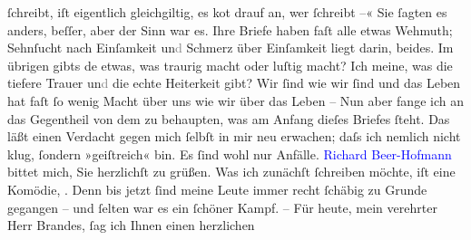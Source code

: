                ſchreibt, iſt eigentlich gleichgiltig, es ko{\geminationm}t drauf an,
               wer ſchreibt –« Sie ſagten es anders, beſſer, aber der Sinn {\pb}war es.\pend
           \pstart
           Ihre Briefe haben faſt alle etwas Wehmuth; Sehnſucht nach Einſamkeit
                  un\textcolor{gray}{d}{ }Schmerz über Einſamkeit liegt darin, beides. Im
               übrigen gibts de{\geminationn} etwas, was traurig macht oder luſtig
               macht? Ich meine, was die tiefere Trauer un\textcolor{gray}{d} die echte Heiterkeit
               gibt? Wir ſind wie wir ſind und das Leben hat faſt ſo wenig Macht über uns wie wir
               über das Leben – Nun aber fange ich an das Gegentheil von dem zu behaupten, {\pb}was am Anfang dieſes Briefes ſteht. Das läßt einen
               Verdacht gegen mich ſelbſt in mir neu erwachen; daſs ich nemlich nicht klug, ſondern
               »geiſtreich« bin. Es ſind wohl nur Anfälle.\pend
           \pstart
           \textcolor{blue}{Richard Beer-Hofmann}{}\ledrightnote{\textcolor{blue}{Richard Beer-Hofmann}} bittet mich, Sie herzlichſt
               zu grüßen.\pend
           \pstart
           Was ich zunächſt ſchreiben möchte, iſt eine Komödie, \label{K_L00643_1v}\label{K_L00643_1h}. Denn bis jetzt ſind meine Leute immer recht
               ſchäbig zu Grunde gegangen – und ſelten war es ein ſchöner Kampf.\pend
           \pstart – Für heute, mein verehrter Herr Brandes, ſag ich Ihnen einen herzlichen \label{T_L00643_2v}\label{T_L00643_2h}\pend{}\endnumbering{}  
      
